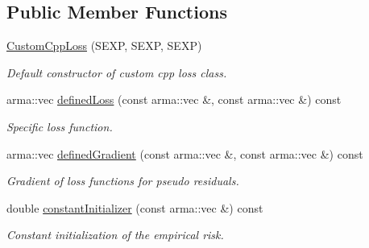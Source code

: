 \subsection*{Public Member Functions}
\begin{DoxyCompactItemize}
\item 
\mbox{\hyperlink{classloss_1_1_custom_cpp_loss_a0616bfb4c640c63a4307d039b32079d1}{Custom\+Cpp\+Loss}} (S\+E\+XP, S\+E\+XP, S\+E\+XP)
\begin{DoxyCompactList}\small\item\em Default constructor of custom cpp loss class. \end{DoxyCompactList}\item 
arma\+::vec \mbox{\hyperlink{classloss_1_1_custom_cpp_loss_a5611805b67b0542449beb898051ab943}{defined\+Loss}} (const arma\+::vec \&, const arma\+::vec \&) const
\begin{DoxyCompactList}\small\item\em Specific loss function. \end{DoxyCompactList}\item 
arma\+::vec \mbox{\hyperlink{classloss_1_1_custom_cpp_loss_a3ff741b3a4d4c3f3515660dcb7b32781}{defined\+Gradient}} (const arma\+::vec \&, const arma\+::vec \&) const
\begin{DoxyCompactList}\small\item\em Gradient of loss functions for pseudo residuals. \end{DoxyCompactList}\item 
double \mbox{\hyperlink{classloss_1_1_custom_cpp_loss_a7e3691161855a4a3152982274e74c96a}{constant\+Initializer}} (const arma\+::vec \&) const
\begin{DoxyCompactList}\small\item\em Constant initialization of the empirical risk. \end{DoxyCompactList}\end{DoxyCompactItemize}

